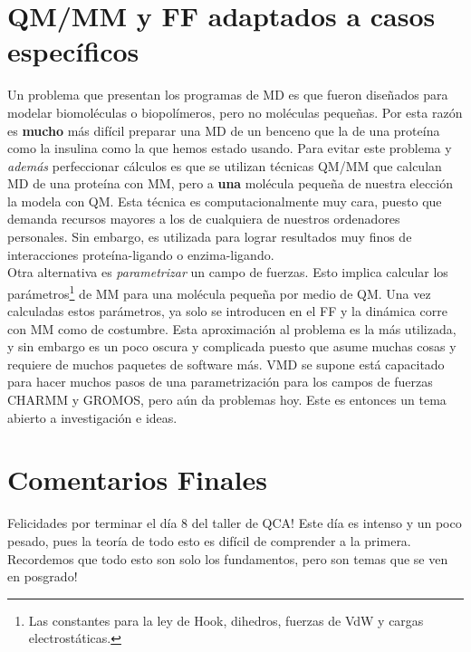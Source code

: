 \documentclass[10pt,letterpaper]{article}
\begin{document}
\section{QM/MM y FF adaptados a casos espec\'ificos}
Un problema que presentan los programas de MD es que fueron dise\~nados para modelar biomol\'eculas o biopol\'imeros, pero no mol\'eculas peque\~nas. Por esta raz\'on es \textbf{mucho} m\'as dif\'icil preparar una MD de un benceno que la de una prote\'ina como la insulina como la que hemos estado usando. Para evitar este problema y \emph{adem\'as} perfeccionar c\'alculos es que se utilizan t\'ecnicas QM/MM que calculan MD de una prote\'ina con MM, pero a \textbf{una} mol\'ecula peque\~na de nuestra elecci\'on la modela con QM. Esta t\'ecnica es computacionalmente muy cara, puesto que demanda recursos mayores a los de cualquiera de nuestros ordenadores personales. Sin embargo, es utilizada para lograr resultados muy finos de interacciones prote\'ina-ligando o enzima-ligando.\\

Otra alternativa es \emph{parametrizar} un campo de fuerzas. Esto implica calcular los par\'ametros\footnote{Las constantes para la ley de Hook, dihedros, fuerzas de VdW y cargas electrost\'aticas.} de MM para una mol\'ecula peque\~na por medio de QM. Una vez calculadas estos par\'ametros, ya solo se introducen en el FF y la din\'amica corre con MM como de costumbre. Esta aproximaci\'on al problema es la m\'as utilizada, y sin embargo es un poco oscura y complicada puesto que asume muchas cosas y requiere de muchos paquetes de software m\'as. VMD se supone est\'a capacitado para hacer muchos pasos de una parametrizaci\'on para los campos de fuerzas CHARMM y GROMOS, pero a\'un da problemas hoy. Este es entonces un tema abierto a investigaci\'on e ideas.

\section{Comentarios Finales}
Felicidades por terminar el d\'ia 8 del taller de QCA! Este d\'ia es intenso y un poco pesado, pues la teor\'ia de todo esto es dif\'icil de comprender a la primera. Recordemos que todo esto son solo los fundamentos, pero son temas que se ven en posgrado!\\
\end{document}

